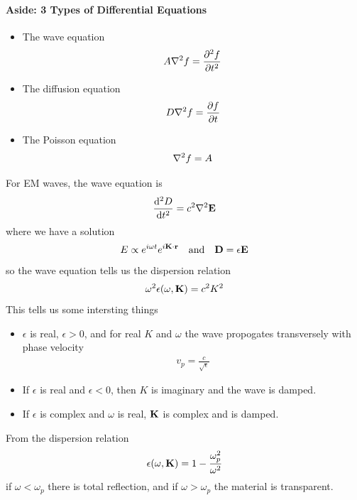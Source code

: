 \documentclass[../main.tex]{subfiles}
\begin{document}
\paragraph*{Aside: 3 Types of Differential Equations}
\begin{itemize}
    \item The wave equation 
    \begin{align*}
        A\laplacian f = \pdv[2]{f}{t}
    \end{align*}
    \item The diffusion equation
    \begin{align*}
        D \laplacian f = \pdv{f}{t}
    \end{align*}
    \item The Poisson equation
    \begin{align*}
        \laplacian f = A
    \end{align*}
\end{itemize}
For EM waves, the wave equation is
\begin{align*}
    \dv[2]{D}{t} = c^2 \laplacian \vb E
\end{align*}
where we have a solution
\begin{align*}
    E \propto e^{i\omega t} e^{i\vb K \cdot \vb r}\qand \vb D = \epsilon \vb E
\end{align*}
so the wave equation tells us the dispersion relation
\begin{align*}
    \omega^2 \epsilon(\omega, \vb K) = c^2 K^2
\end{align*}
This tells us some intersting things
\begin{itemize}
    \item $\epsilon$ is real, $\epsilon > 0$, and for real $K$ and $\omega$ the wave propogates 
    transversely with phase velocity 
    \begin{align*}
        v_p = \frac{c}{\sqrt{\epsilon}}
    \end{align*}
    \item If $\epsilon$ is real and $\epsilon < 0$, then $K$ is imaginary and the wave is damped.
    \item If $\epsilon$ is complex and $\omega$ is real, $\vb K$ is complex and is damped.
\end{itemize}
From the dispersion relation
\begin{align*}
    \epsilon(\omega, \vb K) = 1 - \frac{\omega_p^2}{\omega^2}
\end{align*}
if $\omega < \omega_p$ there is total reflection, and if $\omega > \omega_p$ the material is 
transparent. 
\end{document}

